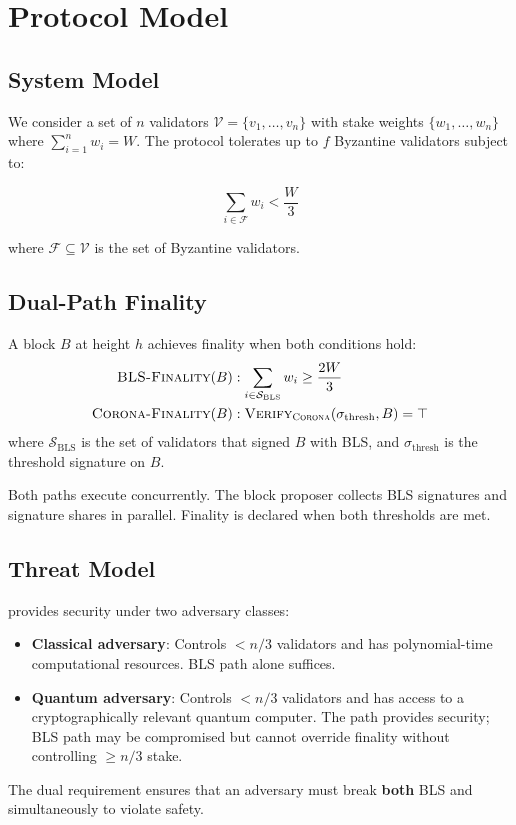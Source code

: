 \section{Protocol Model}


\subsection{System Model}

We consider a set of $n$ validators $\mathcal{V} = \{v_1, \ldots, v_n\}$ with stake weights $\{w_1, \ldots, w_n\}$ where $\sum_{i=1}^{n} w_i = W$. The protocol tolerates up to $f$ Byzantine validators subject to:

\begin{equation}
\sum_{i \in \mathcal{F}} w_i < \frac{W}{3}
\end{equation}

where $\mathcal{F} \subseteq \mathcal{V}$ is the set of Byzantine validators.

\subsection{Dual-Path Finality}

\begin{definition}
A block $B$ at height $h$ achieves \Quasar{} finality when both conditions hold:
\begin{align}
\textsc{BLS-Finality}(B) &: \sum_{i \in \mathcal{S}_{\text{BLS}}} w_i \geq \frac{2W}{3} \label{eq:bls-fin} \\
\textsc{Corona-Finality}(B) &: \textsc{Verify}_{\textsc{Corona}{}}(\sigma_{\text{thresh}}, B) = \top \label{eq:rt-fin}
\end{align}
where $\mathcal{S}_{\text{BLS}}$ is the set of validators that signed $B$ with BLS, and $\sigma_{\text{thresh}}$ is the \Corona{} threshold signature on $B$.
\end{definition}

Both paths execute concurrently. The block proposer collects BLS signatures and \Corona{} signature shares in parallel. Finality is declared when both thresholds are met.

\subsection{Threat Model}

\Quasar{} provides security under two adversary classes:

\begin{itemize}
\item \textbf{Classical adversary}: Controls $< n/3$ validators and has polynomial-time computational resources. BLS path alone suffices.
\item \textbf{Quantum adversary}: Controls $< n/3$ validators and has access to a cryptographically relevant quantum computer. The \Corona{} path provides security; BLS path may be compromised but cannot override \Corona{} finality without controlling $\geq n/3$ stake.
\end{itemize}

The dual requirement ensures that an adversary must break \textbf{both} BLS and \Corona{} simultaneously to violate safety.

